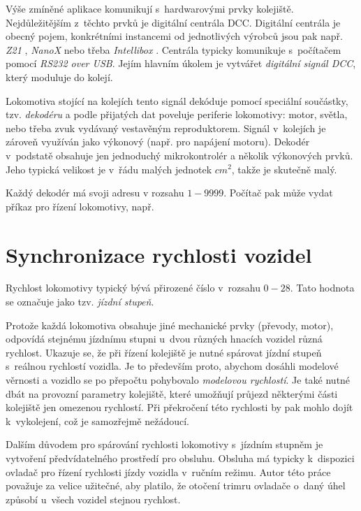 Výše zmíněné aplikace komunikují s~hardwarovými prvky kolejiště.
Nejdůležitějším z~těchto prvků je digitální centrála DCC. Digitální centrála je
obecný pojem, konkrétními instancemi od jednotlivých výrobců jsou pak např.
\textit{Z21} \cite{}, \textit{NanoX} \cite{} nebo třeba \textit{Intellibox}
\cite{}. Centrála typicky komunikuje s~počítačem pomocí \textit{RS232 over
USB}. Jejím hlavním úkolem je vytvářet \textit{digitální signál DCC}, který
moduluje do kolejí.

Lokomotiva stojící na kolejích tento signál dekóduje pomocí speciální
součástky, tzv. \textit{dekodéru} a podle přijatých dat poveluje periferie
lokomotivy: motor, světla, nebo třeba zvuk vydávaný vestavěným reproduktorem.
Signál v~kolejích je zároveň využíván jako výkonový (např. pro napájení
motoru). Dekodér v~podstatě obsahuje jen jednoduchý mikrokontrolér a několik
výkonových prvků. Jeho typická velikost je v~řádu malých jednotek $cm^2$, takže
je skutečně malý.

Každý dekodér má svoji adresu v rozsahu $1-9999$. Počítač pak může vydat příkaz
pro řízení lokomotivy, např. \textit{}

\section{Synchronizace rychlosti vozidel}

Rychlost lokomotivy typický bývá přirozené číslo v~rozsahu $0-28$. Tato hodnota
se označuje jako tzv. \textit{jízdní stupeň}.

Protože každá lokomotiva obsahuje jiné mechanické prvky (převody, motor),
odpovídá stejnému jízdnímu stupni u~dvou různých hnacích vozidel různá
rychlost. Ukazuje se, že při řízení kolejiště je nutné spárovat jízdní stupeň
s~reálnou rychlostí vozidla. Je to především proto, abychom dosáhli modelové
věrnosti a vozidlo se po přepočtu pohybovalo \textit{modelovou rychlostí}. Je
také nutné dbát na provozní parametry kolejiště, které umožňují průjezd
některými části kolejiště jen omezenou rychlostí. Při překročení této rychlosti
by pak mohlo dojít k~vykolejení, což je samozřejmě nežádoucí.

Dalším důvodem pro spárování rychlosti lokomotivy s~jízdním stupněm je
vytvoření předvídatelného prostředí pro obsluhu. Obsluha má typicky k~dispozici
ovladač pro řízení rychlosti jízdy vozidla v~ručním režimu. Autor této práce
považuje za velice užitečné, aby platilo, že otočení trimru ovladače o~daný
úhel způsobí u~všech vozidel stejnou rychlost.

